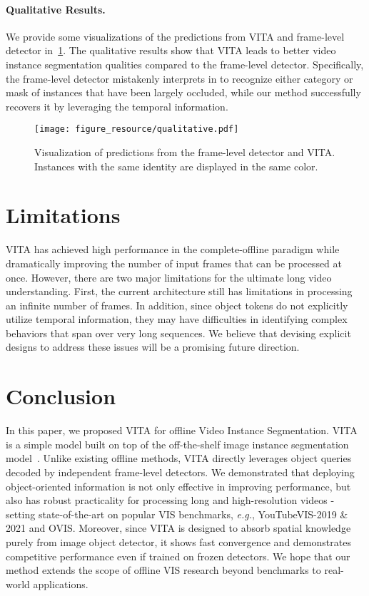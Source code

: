 \documentclass{article}
\begin{document}
\paragraph{Qualitative Results.}
We provide some visualizations of the predictions from VITA and frame-level detector in~\cref{fig:qualitative}.
The qualitative results show that VITA leads to better video instance segmentation qualities compared to the frame-level detector.
Specifically, the frame-level detector mistakenly interprets in to recognize either category or mask of instances that have been largely occluded, while our method successfully recovers it by leveraging the temporal information.

\begin{figure}
  \centering
  \texttt{[image: figure\_resource/qualitative.pdf]}
\caption{
Visualization of predictions from the frame-level detector and VITA. Instances with the same identity are displayed in the same color.
  }
  \label{fig:qualitative}
\end{figure}
 
 \section{Limitations}
\label{sec:limitations}
VITA has achieved high performance in the complete-offline paradigm while dramatically improving the number of input frames that can be processed at once.
However, there are two major limitations for the ultimate long video understanding.
First, the current architecture still has limitations in processing an infinite number of frames.
In addition, since object tokens do not explicitly utilize temporal information, they may have difficulties in identifying complex behaviors that span over very long sequences.
We believe that devising explicit designs to address these issues will be a promising future direction.

\section{Conclusion}
\label{sec:conclusion}
In this paper, we proposed VITA for offline Video Instance Segmentation.
VITA is a simple model built on top of the off-the-shelf image instance segmentation model~\cite{Mask2Former}.
Unlike existing offline methods, VITA directly leverages object queries decoded by independent frame-level detectors.
We demonstrated that deploying object-oriented information is not only effective in improving performance, but also has robust practicality for processing long and high-resolution videos - setting state-of-the-art on popular VIS benchmarks, \emph{e.g.}, YouTubeVIS-2019 \& 2021 and OVIS.
Moreover, since VITA is designed to absorb spatial knowledge purely from image object detector, it shows fast convergence and demonstrates competitive performance even if trained on frozen detectors.
We hope that our method extends the scope of offline VIS research beyond benchmarks to real-world applications.
\end{document}
